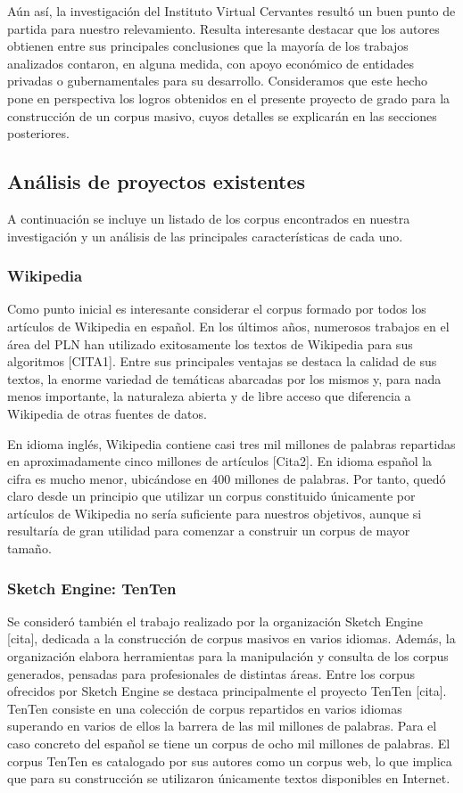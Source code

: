 Aún así, la investigación del Instituto Virtual Cervantes resultó un buen punto de partida para nuestro
relevamiento. Resulta interesante destacar que los autores obtienen entre sus principales conclusiones
que la mayoría de los trabajos analizados contaron, en alguna medida, con apoyo económico de entidades
privadas o gubernamentales para su desarrollo. Consideramos que este hecho pone en perspectiva los logros
obtenidos en el presente proyecto de grado para la construcción de un corpus masivo, cuyos detalles se
explicarán en las secciones posteriores.

\subsection{Análisis de proyectos existentes}

A continuación se incluye un listado de los corpus encontrados en nuestra investigación y un análisis de
las principales características de cada uno.

\subsubsection{Wikipedia}

Como punto inicial es interesante considerar el corpus formado por todos los artículos de Wikipedia en
español. En los últimos años, numerosos trabajos en el área del PLN han utilizado exitosamente los
textos de Wikipedia para sus algoritmos [CITA1]. Entre sus principales ventajas se destaca la calidad
de sus textos, la enorme variedad de temáticas abarcadas por los mismos y, para nada menos importante,
la naturaleza abierta y de libre acceso que diferencia a Wikipedia de otras fuentes de datos.

En idioma inglés, Wikipedia contiene casi tres mil millones de palabras repartidas en aproximadamente
cinco millones de artículos [Cita2]. En idioma español la cifra es mucho menor, ubicándose en 400 millones
de palabras. Por tanto, quedó claro desde un principio que utilizar un corpus constituido únicamente
por artículos de Wikipedia no sería suficiente para nuestros objetivos, aunque si resultaría de gran
utilidad para comenzar a construir un corpus de mayor tamaño.

\subsubsection{Sketch Engine: TenTen}

Se consideró también el trabajo realizado por la organización Sketch Engine [cita], dedicada a la
construcción de corpus masivos en varios idiomas. Además, la organización elabora herramientas para
la manipulación y consulta de los corpus generados, pensadas para profesionales de distintas áreas.
Entre los corpus ofrecidos por Sketch Engine se destaca principalmente el proyecto TenTen [cita].
TenTen consiste en una colección de corpus repartidos en varios idiomas superando en varios de ellos
la barrera de las mil millones de palabras. Para el caso concreto del español se tiene un corpus de
ocho mil millones de palabras. El corpus TenTen es catalogado por sus autores como un corpus web, lo
que implica que para su construcción se utilizaron únicamente textos disponibles en Internet.

